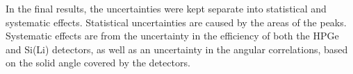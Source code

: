 In the final results, the uncertainties were kept separate into statistical and systematic effects. Statistical uncertainties are caused by the areas of the peaks. Systematic effects are from the uncertainty in the efficiency of both the HPGe and Si(Li) detectors, as well as an uncertainty in the angular correlations, based on the solid angle covered by the detectors.